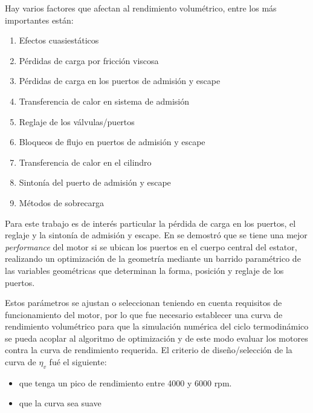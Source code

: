 Hay varios factores que afectan al rendimiento volumétrico, entre los más
importantes están:
%
\begin{enumerate}
    \item Efectos cuasiestáticos
    \item Pérdidas de carga por fricción viscosa
    \item Pérdidas de carga en los puertos de admisión y escape
    \item Transferencia de calor en sistema de admisión
    \item Reglaje de los válvulas/puertos
    \item Bloqueos de flujo en puertos de admisión y escape
    \item Transferencia de calor en el cilindro
    \item Sintonía del puerto de admisión y escape
    \item Métodos de sobrecarga 
\end{enumerate}

Para este trabajo es de interés particular la pérdida de carga en los puertos,
el reglaje y la sintonía de admisión y escape.
%
En \cite{lopez13} se demostró que se tiene una mejor \emph{performance} del
motor si se ubican los puertos en el cuerpo central del estator, realizando un
optimización de la geometría mediante un barrido paramétrico de las variables
geométricas que determinan la forma, posición y reglaje de los puertos.
%

Estos parámetros se ajustan o seleccionan teniendo en cuenta requisitos de
funcionamiento del motor, por lo que fue necesario establecer una curva de
rendimiento volumétrico para que la simulación numérica del
ciclo termodinámico se pueda acoplar al algoritmo de optimización y de este
modo evaluar los motores contra la curva de rendimiento requerida.
%
El criterio de diseño/selección de la curva de $\eta_v$ fué el siguiente:

\begin{itemize}
  \item que tenga un pico de rendimiento entre 4000 y 6000 rpm.
  \item que la curva sea suave
\end{itemize}



